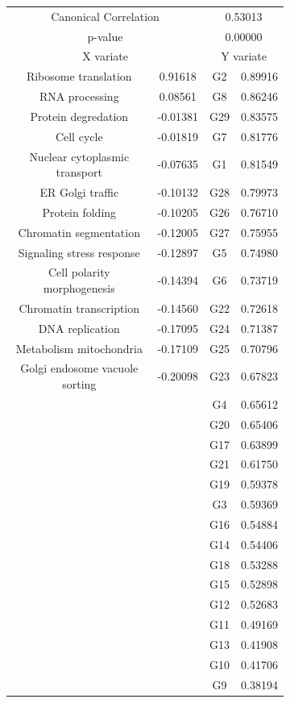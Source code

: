 \begin{figure}
  \begin{subfigure}{.65\textwidth}
  \centering
  \begin{tabular}{ c c | c c }
    \multicolumn{2}{c}{Canonical Correlation} &  \multicolumn{2}{c}{0.53013} \\
    \multicolumn{2}{c}{p-value} &  \multicolumn{2}{c}{0.00000} \\
    \hline
    \multicolumn{2}{c}{X variate} & \multicolumn{2}{c}{Y variate}\\
    \hline
  Ribosome translation & 0.91618 &  G2 & 0.89916\\
  RNA processing & 0.08561 &  G8 & 0.86246\\
  Protein degredation  & -0.01381 &  G29 & 0.83575\\
  Cell cycle & -0.01819 &  G7 & 0.81776\\
  Nuclear cytoplasmic transport & -0.07635 &  G1 & 0.81549\\
  ER Golgi traffic & -0.10132 &  G28 & 0.79973\\
  Protein folding & -0.10205 &  G26 & 0.76710\\
  Chromatin  segmentation & -0.12005 &  G27 & 0.75955\\
  Signaling stress response & -0.12897 &  G5 & 0.74980\\
  Cell polarity morphogenesis & -0.14394 &  G6 & 0.73719\\
  Chromatin transcription & -0.14560 &  G22 & 0.72618\\
  DNA replication & -0.17095 &  G24 & 0.71387\\
  Metabolism mitochondria & -0.17109 &  G25 & 0.70796\\
  Golgi endosome vacuole sorting & -0.20098 &  G23 & 0.67823\\
  & &  G4 & 0.65612\\
  & &  G20 & 0.65406\\
  & &  G17 & 0.63899\\
  & &  G21 & 0.61750\\
  & &  G19 & 0.59378\\
  & &  G3 & 0.59369\\
  & &  G16 & 0.54884\\
  & &  G14 & 0.54406\\
  & &  G18 & 0.53288\\
  & &  G15 & 0.52898\\
  & &  G12 & 0.52683\\
  & &  G11 & 0.49169\\
  & &  G13 & 0.41908\\
  & &  G10 & 0.41706\\
  & &  G9 & 0.38194\\


\end{tabular}
\end{subfigure}
\end{figure}
